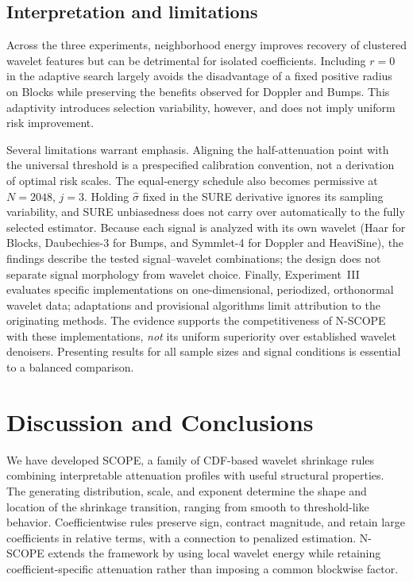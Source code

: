 \documentclass[12pt]{article}
\theoremstyle{definition}
\theoremstyle{definition}
\begin{document}
\subsection{Interpretation and limitations}
\label{sec:simul-discussion}

Across the three experiments, neighborhood energy improves recovery
of clustered wavelet features but can be detrimental for isolated
coefficients. Including $r=0$ in the adaptive search largely avoids
the disadvantage of a fixed positive radius on Blocks while
preserving the benefits observed for Doppler and Bumps. This
adaptivity introduces selection variability, however, and does
not imply uniform risk improvement.

Several limitations warrant emphasis. Aligning the half-attenuation
point with the universal threshold is a prespecified calibration
convention, not a derivation of optimal risk scales. The equal-energy
schedule also becomes permissive at $N=2048$, $j=3$. Holding
$\widehat\sigma$ fixed in the SURE derivative ignores its sampling
variability, and SURE unbiasedness does not carry over automatically
to the fully selected estimator. Because each signal is analyzed
with its own wavelet (Haar for Blocks, Daubechies-3 for Bumps, and
Symmlet-4 for Doppler and HeaviSine), the findings describe the tested
signal--wavelet combinations; the design does not separate signal
morphology from wavelet choice. Finally, Experiment~III evaluates
specific implementations on one-dimensional, periodized, orthonormal
wavelet data; adaptations and provisional algorithms limit attribution
to the originating methods. The evidence supports the competitiveness
of N-SCOPE with these implementations, \emph{not} its uniform
superiority over established wavelet denoisers. Presenting results
for all sample sizes and signal conditions is essential to a
balanced comparison.

\section{Discussion and Conclusions}
\label{sec:conclusions}

We have developed SCOPE, a family of CDF-based wavelet shrinkage
rules combining interpretable attenuation profiles with useful
structural properties. The generating distribution, scale, and
exponent determine the shape and location of the shrinkage
transition, ranging from smooth to threshold-like behavior.
Coefficientwise rules preserve sign, contract magnitude, and
retain large coefficients in relative terms, with a connection
to penalized estimation. N-SCOPE extends the framework by using
local wavelet energy while retaining coefficient-specific
attenuation rather than imposing a common blockwise factor.
\end{document}
